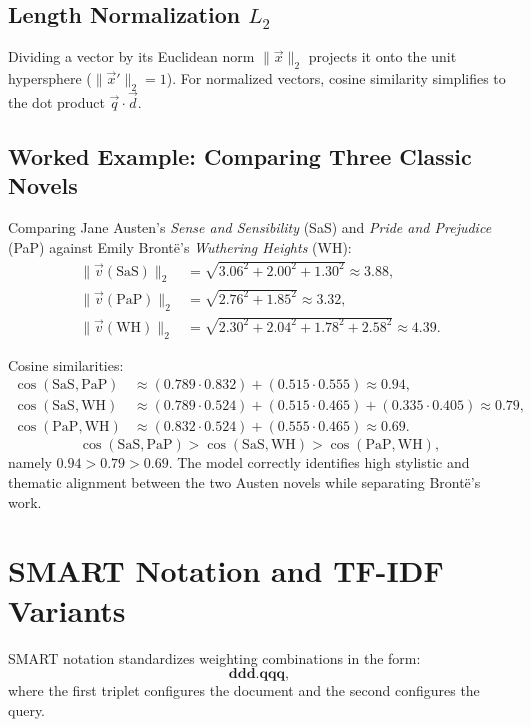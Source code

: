 \subsection[L2 Normalization]{Length Normalization \texorpdfstring{$L_2$}{L2}}
Dividing a vector by its Euclidean norm $\|\vec{x}\|_2$ projects it onto the unit hypersphere ($\|\vec{x}'\|_2 = 1$). For normalized vectors, cosine similarity simplifies to the dot product $\vec{q} \cdot \vec{d}$.

\subsection{Worked Example: Comparing Three Classic Novels}
Comparing Jane Austen's \textit{Sense and Sensibility} (SaS) and \textit{Pride and Prejudice} (PaP) against Emily Bront\"e's \textit{Wuthering Heights} (WH):
\begin{align*}
\|\vec{v}(\text{SaS})\|_2 &= \sqrt{3.06^2 + 2.00^2 + 1.30^2} \approx 3.88, \\
\|\vec{v}(\text{PaP})\|_2 &= \sqrt{2.76^2 + 1.85^2} \approx 3.32, \\
\|\vec{v}(\text{WH})\|_2  &= \sqrt{2.30^2 + 2.04^2 + 1.78^2 + 2.58^2} \approx 4.39.
\end{align*}

Cosine similarities:
\begin{align*}
\cos(\text{SaS}, \text{PaP}) &\approx (0.789 \cdot 0.832) + (0.515 \cdot 0.555) \approx \mathbf{0.94}, \\
\cos(\text{SaS}, \text{WH})  &\approx (0.789 \cdot 0.524) + (0.515 \cdot 0.465) + (0.335 \cdot 0.405) \approx \mathbf{0.79}, \\
\cos(\text{PaP}, \text{WH})  &\approx (0.832 \cdot 0.524) + (0.555 \cdot 0.465) \approx \mathbf{0.69}.
\end{align*}
\begin{equation}
\cos(\text{SaS}, \text{PaP}) > \cos(\text{SaS}, \text{WH}) > \cos(\text{PaP}, \text{WH}),
\end{equation}
namely $0.94 > 0.79 > 0.69$. The model correctly identifies high stylistic and thematic alignment between the two Austen novels while separating Bront\"e's work.

\FloatBarrier
\section{SMART Notation and TF-IDF Variants}
\label{sec:smart-notation-en}

SMART notation standardizes weighting combinations in the form:
\begin{equation}
\mathbf{ddd.qqq},
\end{equation}
where the first triplet configures the document and the second configures the query.

